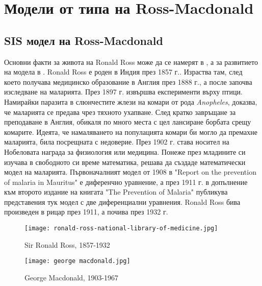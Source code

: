 \section{\hspace{1em} Модели от типа на Ross-Macdonald}

\subsection{SIS модел на Ross-Macdonald}

Основни факти за живота на Ronald Ross може да се намерят в \cite[глава~12]{Bacaer2011}, а за развитието на модела в \cite{Smith2012}.
Ronald Ross е роден в Индия през 1857 г..
Израства там, след което получава медицинско образование в Англия през 1888 г., а после започва изследване на маларията.
През 1897 г. извършва експерименти върху птици.
Намирайки паразита в слюнчестите жлези на комари от рода \textit{Anopheles}, доказва, че маларията се предава чрез тяхното ухапване.
След кратко завръщане за преподаване в Англия, обикаля по много места с цел лансиране борбата срещу комарите. Идеята, че намаляването на популацията комари би могло да премахне маларията, била посрещната с недоверие.
През 1902 г. става носител на Нобеловата награда за физиология или медицина.
Понеже през младините си изучава в свободното си време математика, решава да създаде математически модел на маларията.
Първоначалният модел от 1908 в "Report on the prevention of malaria in Mauritus" е диференчно уравнение, а през 1911 г. в допълнение към второто издание на книгата "The Prevention of Malaria" публикува представения тук модел с две диференциални уравнения.
Ronald Ross бива произведен в рицар през 1911, а почива през 1932 г.



\begin{figure}[H]
  \centering
  \begin{minipage}{.5\textwidth}
    \centering
    \texttt{[image: ronald-ross-national-library-of-medicine.jpg]}
    \caption{Sir Ronald Ross, 1857-1932}
    \label{fig:Ross}
    \end{minipage}%
    \begin{minipage}{.5\textwidth}
    \centering
    \texttt{[image: george macdonald.jpg]}
    \caption{George Macdonald, 1903-1967}
    \label{fig:Macdonald}
  \end{minipage}
\end{figure}

